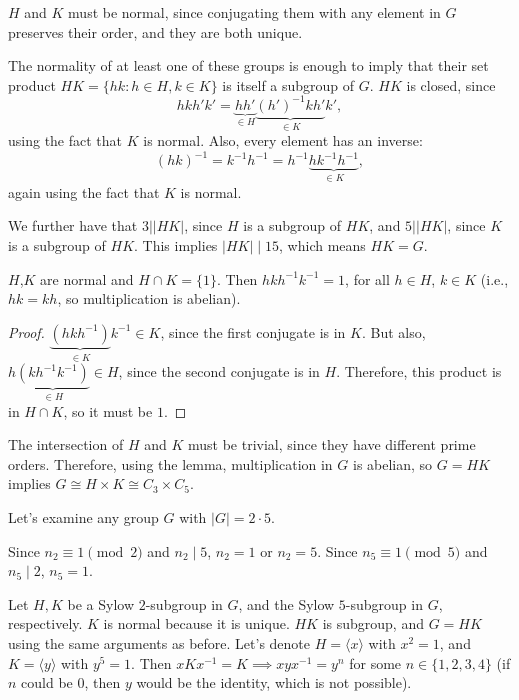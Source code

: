 $H$ and $K$ must be normal, since conjugating them with any element in $G$ preserves their order, and they are both unique. 

The normality of at least one of these groups is enough to imply that their set product $HK = \{hk : h\in H, k\in K\}$ is itself a subgroup of $G$. $HK$ is closed, since \[hkh'k' = \underbrace{hh'}_{\in H}\underbrace{(h')^{-1}kh'}_{\in K}k',\] using the fact that $K$ is normal. Also, every element has an inverse: \[(hk)^{-1} = k^{-1}h^{-1} = h^{-1}\underbrace{hk^{-1}h^{-1}}_{\in K},\] again using the fact that $K$ is normal. 

We further have that $3\mid \vert HK\vert$, since $H$ is a subgroup of $HK$, and $5\mid \vert HK\vert$, since $K$ is a subgroup of $HK$. This implies $\vert HK\vert \mid 15$, which means $HK = G$.

\begin{theorem}
\lemlabel 

$H$,$K$ are normal and $H\cap K = \{1\}$. Then $hkh^{-1}k^{-1} = 1$, for all $h\in H$, $k\in K$ (i.e., $hk = kh$, so multiplication is abelian). 
\end{theorem}

\begin{proof}
$\underbrace{(hkh^{-1})}_{\in K}k^{-1}\in K$, since the first conjugate is in $K$. But also, $h\underbrace{(kh^{-1}k^{-1})}_{\in H}\in H$, since the second conjugate is in $H$. Therefore, this product is in $H\cap K$, so it must be $1$.
\end{proof}

The intersection of $H$ and $K$ must be trivial, since they have different prime orders. Therefore, using the lemma, multiplication in $G$ is abelian, so $G=HK$ implies $G\cong H\times K \cong C_3\times C_5$.

\begin{example}
\exlabel 

Let's examine any group $G$ with $\vert G\vert = 2\cdot 5$.
\end{example}

Since $n_2\equiv 1\pmod{2}$ and $n_2\mid 5$, $n_2=1$ or $n_2=5$. Since $n_5\equiv 1\pmod{5}$ and $n_5\mid 2$, $n_5=1$. 

Let $H,K$ be a Sylow $2$-subgroup in $G$, and the Sylow $5$-subgroup in $G$, respectively. $K$ is normal because it is unique. $HK$ is subgroup, and $G = HK$ using the same arguments as before. Let's denote $H = \langle x\rangle$ with $x^2=1$, and $K = \langle y\rangle$ with $y^5=1$. Then $xKx^{-1} = K \implies xyx^{-1} = y^n$ for some $n\in \{1,2,3,4\}$ (if $n$ could be $0$, then $y$ would be the identity, which is not possible).

